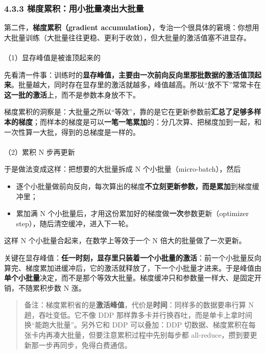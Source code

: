 \documentclass[
  chinese,
]{ctexart}
\makeatletter
\let\oldparagraph\paragraph
\renewcommand{\paragraph}{
    \@ifstar
      \xxxParagraphStar
      \xxxParagraphNoStar
  }
\newcommand{\xxxParagraphStar}[1]{\oldparagraph*{#1}\mbox{}}
\newcommand{\xxxParagraphNoStar}[1]{\oldparagraph{#1}\mbox{}}
\providecommand{\tightlist}{%
  \setlength{\itemsep}{0pt}\setlength{\parskip}{0pt}}
\makeatother
\begin{document}
\subsubsection{4.3.3
梯度累积：用小批量凑出大批量}\label{ux68afux5ea6ux7d2fux79efux7528ux5c0fux6279ux91cfux51d1ux51faux5927ux6279ux91cf}

第二件，\textbf{梯度累积（gradient
accumulation）}，专治一个很具体的窘境：你想用大批量训练（大批量往往更稳、更利于收敛），但大批量的激活值塞不进显存。

\paragraph{（1）显存峰值是被谁顶起来的}\label{ux663eux5b58ux5cf0ux503cux662fux88abux8c01ux9876ux8d77ux6765ux7684}

先看清一件事：训练时的\textbf{显存峰值，主要由一次前向反向里那批数据的激活值顶起来}。批量越大，同时存在显存里的激活就越多，峰值越高。所以``放不下''常常卡在\textbf{这一批的激活}上，而不是参数本身放不下。

梯度累积的洞察是：大批量之所以``等效''，靠的是它在更新参数前\textbf{汇总了足够多样本的梯度}；而样本的梯度是可以\textbf{一笔一笔累加}的：分几次算、把梯度加到一起，和一次性算一大批，得到的总梯度是一样的。

\paragraph{（2）累积 N
步再更新}\label{ux7d2fux79ef-n-ux6b65ux518dux66f4ux65b0}

于是做法变成这样：把想要的大批量拆成 N 个小批量（micro-batch），然后

\begin{itemize}
\tightlist
\item
  逐个小批量做前向反向，每次算出的梯度\textbf{不立刻更新参数，而是累加}到梯度缓冲里；
\item
  累加满 N
  个小批量后，才用这份累加好的梯度做\textbf{一次}参数更新（optimizer
  step），随后清空缓冲，进入下一轮。
\end{itemize}

这样 N 个小批量合起来，在数学上等效于一个 N 倍大的批量做了一次更新。

关键在显存峰值：\textbf{任一时刻，显存里只装着一个小批量的激活}：前一个小批量反向算完、梯度累加进缓冲后，它的激活就释放了，下一个小批量才进来。于是峰值由\textbf{单个小批量}决定，而不是那个等效大批量。梯度缓冲只和参数量一样大、是固定开销，不随累积步数
N 涨。

\begin{quote}
备注：梯度累积省的是\textbf{激活峰值}，代价是\textbf{时间}：同样多的数据要串行算
N 趟，吞吐变低。它不像 DDP
那样靠多卡并行换吞吐，而是单卡上拿时间换``能跑大批量''。另外它和 DDP
可以叠加：DDP
切数据、梯度累积在每张卡内再凑大批量，但要注意累积过程中先别每步都
all-reduce，攒到要更新那一步再同步，免得白费通信。
\end{quote}
\end{document}
